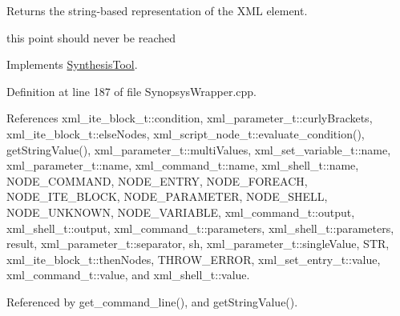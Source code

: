 Returns the string-\/based representation of the X\+ML element. 

this point should never be reached 

Implements \hyperlink{classSynthesisTool_a98c5ba46f950300e1a5ca7cfcb409852}{Synthesis\+Tool}.



Definition at line 187 of file Synopsys\+Wrapper.\+cpp.



References xml\+\_\+ite\+\_\+block\+\_\+t\+::condition, xml\+\_\+parameter\+\_\+t\+::curly\+Brackets, xml\+\_\+ite\+\_\+block\+\_\+t\+::else\+Nodes, xml\+\_\+script\+\_\+node\+\_\+t\+::evaluate\+\_\+condition(), get\+String\+Value(), xml\+\_\+parameter\+\_\+t\+::multi\+Values, xml\+\_\+set\+\_\+variable\+\_\+t\+::name, xml\+\_\+parameter\+\_\+t\+::name, xml\+\_\+command\+\_\+t\+::name, xml\+\_\+shell\+\_\+t\+::name, N\+O\+D\+E\+\_\+\+C\+O\+M\+M\+A\+ND, N\+O\+D\+E\+\_\+\+E\+N\+T\+RY, N\+O\+D\+E\+\_\+\+F\+O\+R\+E\+A\+CH, N\+O\+D\+E\+\_\+\+I\+T\+E\+\_\+\+B\+L\+O\+CK, N\+O\+D\+E\+\_\+\+P\+A\+R\+A\+M\+E\+T\+ER, N\+O\+D\+E\+\_\+\+S\+H\+E\+LL, N\+O\+D\+E\+\_\+\+U\+N\+K\+N\+O\+WN, N\+O\+D\+E\+\_\+\+V\+A\+R\+I\+A\+B\+LE, xml\+\_\+command\+\_\+t\+::output, xml\+\_\+shell\+\_\+t\+::output, xml\+\_\+command\+\_\+t\+::parameters, xml\+\_\+shell\+\_\+t\+::parameters, result, xml\+\_\+parameter\+\_\+t\+::separator, sh, xml\+\_\+parameter\+\_\+t\+::single\+Value, S\+TR, xml\+\_\+ite\+\_\+block\+\_\+t\+::then\+Nodes, T\+H\+R\+O\+W\+\_\+\+E\+R\+R\+OR, xml\+\_\+set\+\_\+entry\+\_\+t\+::value, xml\+\_\+command\+\_\+t\+::value, and xml\+\_\+shell\+\_\+t\+::value.



Referenced by get\+\_\+command\+\_\+line(), and get\+String\+Value().

